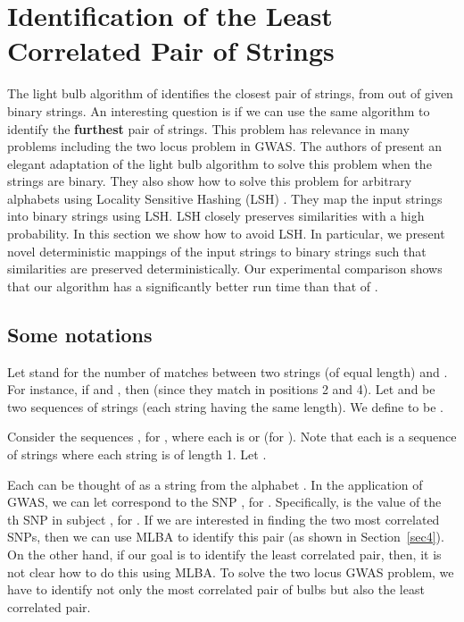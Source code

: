 \documentclass{article}
\theoremstyle{definition}
\theoremstyle{remark}
\begin{document}
\section{Identification of the Least Correlated Pair of Strings}\label{sec5}
The light bulb algorithm of \cite{RSJ89} identifies the closest pair of strings, from out of  given binary strings. An interesting question is if we can use the same algorithm to identify the {\bf furthest} pair of strings. This problem has relevance in many problems including the two locus problem in GWAS.
The authors of \cite{PBK11} present an elegant adaptation of the light bulb algorithm to solve this problem when the strings are binary. They also show how to solve this problem for arbitrary alphabets using Locality Sensitive Hashing (LSH) \cite{M02}. They map the input strings into binary strings using LSH. LSH closely preserves similarities with a high probability. In this section we show how to avoid LSH. In particular, we present novel deterministic mappings of the input strings to binary strings such that similarities are preserved deterministically.  Our experimental comparison shows that our algorithm has a  significantly better run time than that of \cite{PBK11}.


\subsection{Some notations}
 Let  stand for the number of matches between two strings (of equal length)  and . For instance, if  and , then  (since they match in positions 2 and 4). Let  and  be two sequences of strings (each string having the same length). We define  to be .

   Consider the sequences , for , where each  is  or  (for ). Note that each  is a sequence of strings where each string is of length 1. Let .

Each  can be thought of as a string from the alphabet . In the application of GWAS, we can let  correspond to the SNP , for . Specifically,  is the value of the th SNP in subject , for . If we are interested in finding the two most correlated SNPs, then we can use MLBA to identify this pair (as shown in Section~\ref{sec4}). On the other hand, if our goal is to identify the least correlated pair, then, it is not clear how to do this using MLBA. To solve the two locus GWAS problem, we have to identify not only the most correlated pair of bulbs but also the least correlated pair.
\end{document}
